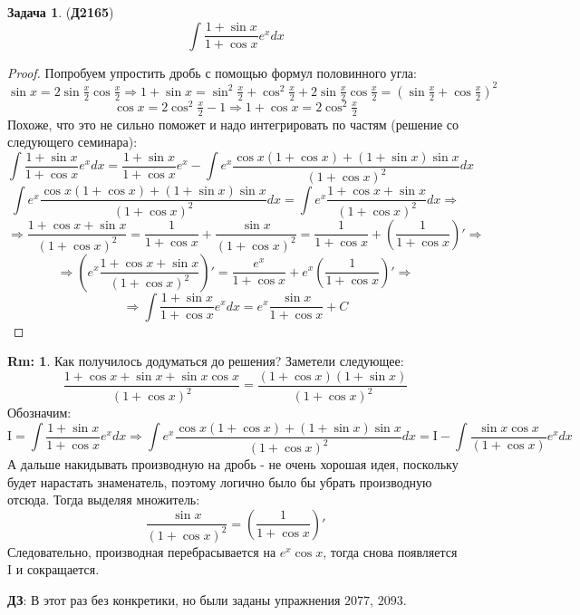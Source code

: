\documentclass[12pt]{article}
\newcommand{\MI}{\mathrm{I}}
\theoremstyle{definition}
\newtheorem{rem}{Rm:}
\newtheorem{problem}{Задача}
\DeclareMathOperator{\dint}{\displaystyle\int}
\begin{document}
\begin{problem}(\textbf{Д2165})
	$$
		\dint \dfrac{1 + \sin{x}}{1 + \cos{x}}e^x dx
	$$
\end{problem}
\begin{proof}
	Попробуем упростить дробь с помощью формул половинного угла:
	$$
		\sin{x} = 2 \sin{\tfrac{x}{2}}\cos{\tfrac{x}{2}} \Rightarrow 1 + \sin{x} = \sin^2{\tfrac{x}{2}} + \cos^2{\tfrac{x}{2}} + 2 \sin{\tfrac{x}{2}}\cos{\tfrac{x}{2}} = \left(\sin{\tfrac{x}{2}} + \cos{\tfrac{x}{2}}\right)^2 
	$$
	$$
		\cos{x} = 2 \cos^2 \tfrac{x}{2} - 1 \Rightarrow 1 + \cos{x} = 2 \cos^2 \tfrac{x}{2}
	$$
	Похоже, что это не сильно поможет и надо интегрировать по частям (решение со следующего семинара):
	$$
		\dint \dfrac{1 + \sin{x}}{1 + \cos{x}}e^x dx = \dfrac{1 + \sin{x}}{1 + \cos{x}}e^x - \dint e^x\dfrac{\cos{x}(1 + \cos{x}) + (1 + \sin{x})\sin{x}}{(1 + \cos{x})^2}dx 
	$$
	$$
		\dint e^x\dfrac{\cos{x}(1 + \cos{x}) + (1 + \sin{x})\sin{x}}{(1 + \cos{x})^2}dx = \dint e^x\dfrac{1 + \cos{x}  + \sin{x} }{(1 + \cos{x})^2}dx \Rightarrow
	$$
	$$
		\Rightarrow \dfrac{1 + \cos{x}  + \sin{x} }{(1 + \cos{x})^2} = \dfrac{1}{1 + \cos{x}} + \dfrac{\sin{x}}{(1 + \cos{x})^2} = \dfrac{1}{1 + \cos{x}} + \left(\dfrac{1}{1 + \cos{x}}\right)' \Rightarrow 
	$$
	$$
		\Rightarrow \left( e^x\dfrac{1 + \cos{x}  + \sin{x} }{(1 + \cos{x})^2}\right)' = \dfrac{e^x}{1 + \cos{x}} + e^x\left(\dfrac{1}{1 + \cos{x}}\right)' \Rightarrow 
	$$
	$$
		\Rightarrow \dint \dfrac{1 + \sin{x}}{1 + \cos{x}}e^x dx = e^x\dfrac{\sin{x}}{1 + \cos{x}} + C
	$$
\end{proof}
\begin{rem}
	Как получилось додуматься до решения? Заметели следующее:
	$$
		\dfrac{1 + \cos{x} + \sin{x} + \sin{x}\cos{x}}{(1 + \cos{x})^2} = \dfrac{(1 + \cos{x})(1 + \sin{x})}{(1 + \cos{x})^2}
	$$	
	Обозначим:
	$$
		\MI = \dint \dfrac{1 + \sin{x}}{1 + \cos{x}}e^x dx \Rightarrow \dint e^x\dfrac{\cos{x}(1 + \cos{x}) + (1 + \sin{x})\sin{x}}{(1 + \cos{x})^2}dx = \MI - \dint\dfrac{\sin{x}\cos{x}}{(1 + \cos{x})}e^xdx 
	$$
	А дальше накидывать производную на дробь - не очень хорошая идея, поскольку будет нарастать знаменатель, поэтому логично было бы убрать производную отсюда. Тогда выделяя множитель:
	$$
		\dfrac{\sin{x}}{(1 + \cos{x})^2} = \left(\dfrac{1}{1 + \cos{x}}\right)'
	$$
	Следовательно, производная перебрасывается на $e^x \cos{x}$, тогда снова появляется $\MI$ и сокращается.
\end{rem}

\textbf{ДЗ}: В этот раз без конкретики, но были заданы упражнения $2077$, $2093$.
\end{document}
